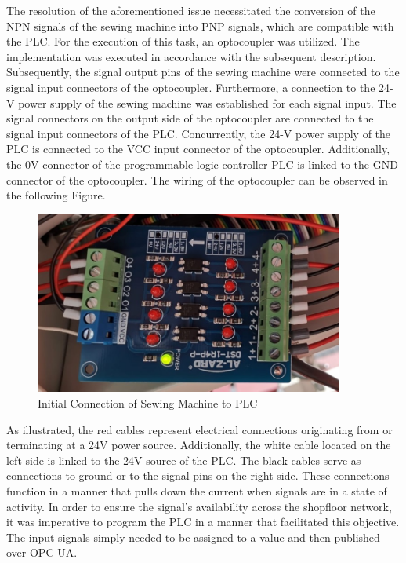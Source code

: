 The resolution of the aforementioned issue necessitated the conversion of the NPN signals of the sewing machine into PNP signals, which are compatible with the PLC. For the execution of this task, an optocoupler was utilized. The implementation was executed in accordance with the subsequent description. Subsequently, the signal output pins of the sewing machine were connected to the signal input connectors of the optocoupler. Furthermore, a connection to the 24-V power supply of the sewing machine was established for each signal input. The signal connectors on the output side of the optocoupler are connected to the signal input connectors of the PLC. Concurrently, the 24-V power supply of the PLC is connected to the VCC input connector of the optocoupler. Additionally, the 0V connector of the programmable logic controller PLC is linked to the GND connector of the optocoupler. The wiring of the optocoupler can be observed in the following Figure.
\begin{figure}[H]
	\centering
	\includegraphics[height=6cm]{pic/optocoupler-wiring.jpg}
	\caption{Initial Connection of Sewing Machine to PLC}
	\label{fig:Model-Component-Pattern}
\end{figure}
As illustrated, the red cables represent electrical connections originating from or terminating at a 24V power source. Additionally, the white cable located on the left side is linked to the 24V source of the PLC. The black cables serve as connections to ground or to the signal pins on the right side. These connections function in a manner that pulls down the current when signals are in a state of activity.
In order to ensure the signal's availability across the shopfloor network, it was imperative to program the PLC in a manner that facilitated this objective. The input signals simply needed to be assigned to a value and then published over OPC UA. \\
